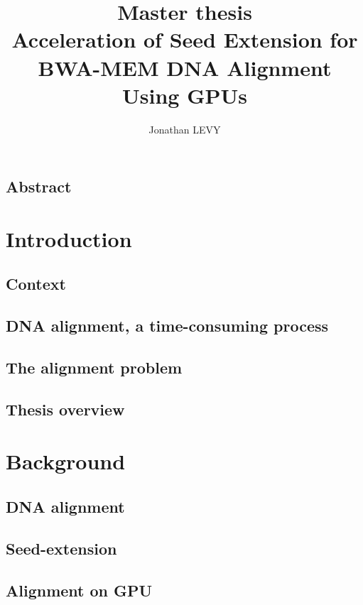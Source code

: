 \documentclass[11pt,a4paper]{report}
\author{Jonathan LEVY}
\title{Master thesis \\ Acceleration of Seed Extension for BWA-MEM DNA Alignment Using GPUs}
\begin{document}
	\maketitle
	
	\section*{Abstract}
	
	
	\tableofcontents
	
	\chapter{Introduction}
	\label{chap:intro}
	
	
		\section{Context}
		
		
		\section{DNA alignment, a time-consuming process}
		
		
		\section{The alignment problem}
		
	
		\section{Thesis overview}
		
		
	\chapter{Background}
	\label{chap:background}
		\section{DNA alignment}
		
		
		\section{Seed-extension}
		
		
		\section{Alignment on GPU}
		
		
\end{document}
